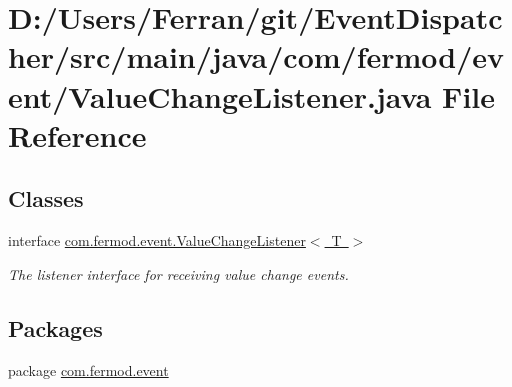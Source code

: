 \hypertarget{a00005}{}\section{D\+:/\+Users/\+Ferran/git/\+Event\+Dispatcher/src/main/java/com/fermod/event/\+Value\+Change\+Listener.java File Reference}
\label{a00005}
\subsection*{Classes}
\begin{DoxyCompactItemize}
\item 
interface \mbox{\hyperlink{a00026}{com.\+fermod.\+event.\+Value\+Change\+Listener$<$ T $>$}}
\begin{DoxyCompactList}\small\item\em The listener interface for receiving value change events. \end{DoxyCompactList}\end{DoxyCompactItemize}
\subsection*{Packages}
\begin{DoxyCompactItemize}
\item 
package \mbox{\hyperlink{a00014}{com.\+fermod.\+event}}
\end{DoxyCompactItemize}
